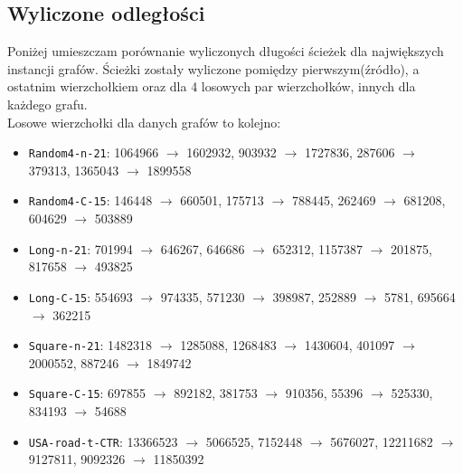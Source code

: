 \documentclass{article}
\begin{document}
\subsection{Wyliczone odległości}
Poniżej umieszczam porównanie wyliczonych długości ścieżek dla największych instancji grafów.
Ścieżki zostały wyliczone pomiędzy pierwszym(źródło), a ostatnim wierzchołkiem oraz dla 4 losowych par wierzchołków, innych dla każdego grafu. \\

\noindent Losowe wierzchołki dla danych grafów to kolejno:
\begin{itemize}
    \item \texttt{Random4-n-21}: 1064966 $\rightarrow$ 1602932, 903932 $\rightarrow$ 1727836, 287606 $\rightarrow$ 379313, 1365043 $\rightarrow$ 1899558 
    \item \texttt{Random4-C-15}: 146448 $\rightarrow$ 660501, 175713 $\rightarrow$ 788445, 262469 $\rightarrow$ 681208, 604629 $\rightarrow$ 503889
    \item \texttt{Long-n-21}: 701994 $\rightarrow$ 646267, 646686 $\rightarrow$ 652312, 1157387 $\rightarrow$ 201875, 817658 $\rightarrow$ 493825
    \item \texttt{Long-C-15}: 554693 $\rightarrow$ 974335, 571230 $\rightarrow$ 398987, 252889 $\rightarrow$ 5781, 695664 $\rightarrow$ 362215
    \item \texttt{Square-n-21}: 1482318 $\rightarrow$ 1285088, 1268483 $\rightarrow$ 1430604, 401097 $\rightarrow$ 2000552, 887246 $\rightarrow$ 1849742
    \item \texttt{Square-C-15}: 697855 $\rightarrow$ 892182, 381753 $\rightarrow$ 910356, 55396 $\rightarrow$ 525330, 834193 $\rightarrow$ 54688
    \item \texttt{USA-road-t-CTR}: 13366523 $\rightarrow$ 5066525, 7152448 $\rightarrow$ 5676027, 12211682 $\rightarrow$ 9127811, 9092326 $\rightarrow$ 11850392
\end{itemize}
\end{document}
